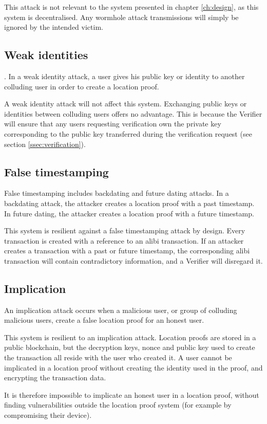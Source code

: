 This attack is not relevant to the system presented in chapter \ref{ch:design}, as this system is decentralised. Any wormhole attack transmissions will simply be ignored by the intended victim.

\subsection{Weak identities}.
In a weak identity attack, a user gives his public key or identity to another colluding user in order to create a location proof.

A weak identity attack will not affect this system. Exchanging public keys or identities between colluding users offers no advantage. This is because the Verifier will ensure that any users requesting verification own the private key corresponding to the public key transferred during the verification request (see section \ref{ssec:verification}).

\subsection{False timestamping}
False timestamping includes backdating and future dating attacks. In a backdating attack, the attacker creates a location proof with a past timestamp. In future dating, the attacker creates a location proof with a future timestamp.

This system is resilient against a false timestamping attack by design. Every transaction is created with a reference to an alibi transaction. If an attacker creates a transaction with a past or future timestamp, the corresponding alibi transaction will contain contradictory information, and a Verifier will disregard it.

\subsection{Implication}
An implication attack occurs when a malicious user, or group of colluding malicious users, create a false location proof for an honest user.

This system is resilient to an implication attack. Location proofs are stored in a public blockchain, but the decryption keys, nonce and public key used to create the transaction all reside with the user who created it. A user cannot be implicated in a location proof without creating the identity used in the proof, and encrypting the transaction data.

It is therefore impossible to implicate an honest user in a location proof, without finding vulnerabilities outside the location proof system (for example by compromising their device).

